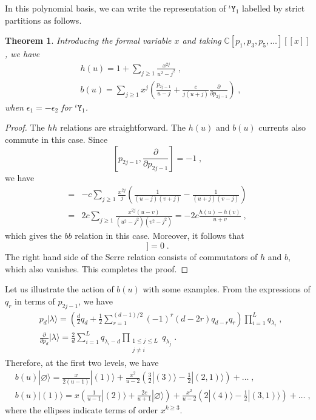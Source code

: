 \documentclass[11pt]{article}
\numberwithin{equation}{section}
\numberwithin{figure}{section}
\numberwithin{table}{section}
\newtheorem{theorem}{Theorem}[section]
\begin{document}
In this polynomial basis, we can write the representation of ${}^\iota\mathtt{Y}_1$ labelled by strict partitions as follows.
\begin{theorem}
	Introducing the formal variable $x$ and taking $\mathbb{C}[p_1,p_3,p_5,\dots][\![x]\!]$, we have
	\begin{subequations}
		\begin{align}
			&h(u)=1+\sum_{j\geq1}\frac{x^{2j}}{u^2-j^2}\;,\\
			&b(u)=\sum_{j\geq1}x^j\left(\frac{p_{2j-1}}{u-j}+\frac{c}{j(u+j)}\frac{\partial}{\partial p_{2j-1}}\right)\;,
		\end{align}
	\end{subequations}
	when $\epsilon_1=-\epsilon_2$ for ${}^\iota\mathtt{Y}_1$.
\end{theorem}
\begin{proof}
	The $hh$ relations are straightforward. The $h(u)$ and $b(u)$ currents also commute in this case. Since
	\begin{equation}
		\left[p_{2j-1},\frac{\partial}{\partial p_{2j-1}}\right]=-1\;,
	\end{equation}
	we have
	\begin{align}
		[b(u),b(v)]=&-c\sum_{j\geq1}\frac{x^{2j}}{j}\left(\frac1{(u-j)(v+j)}-\frac{1}{(u+j)(v-j)}\right)\nonumber\\
		=&2c\sum_{j\geq1}\frac{x^{2j}(u-v)}{(u^2-j^2)(v^2-j^2)}=-2c\frac{h(u)-h(v)}{u+v}\;,
	\end{align}
	which gives the $bb$ relation in this case. Moreover, it follows that
	\begin{equation}
		[b(u_1),[b(u_2),b(u_3)]]=0\;.
	\end{equation}
	The right hand side of the Serre relation consists of commutators of $h$ and $b$, which also vanishes. This completes the proof.
\end{proof}

Let us illustrate the action of $b(u)$ with some examples. From the expressions of $q_r$ in terms of $p_{2j-1}$, we have
\begin{subequations}
	\begin{align}
		&p_d|\lambda\rangle=\left(\frac{d}{2}q_d+\frac{1}{2}\sum_{r=1}^{(d-1)/2}(-1)^r(d-2r)q_{d-r}q_r\right)\prod_{i=1}^Lq_{\lambda_i}\;,\\
		&\frac{\partial}{\partial p_d}|\lambda\rangle=\frac{2}{d}\sum_{i=1}^Lq_{\lambda_i-d}\prod_{\substack{1\leq j\leq L\\j\neq i}}q_{\lambda_j}\;.
	\end{align}
\end{subequations}
Therefore, at the first two levels, we have
\begin{subequations}
	\begin{align}
		&b(u)|\varnothing\rangle=\frac{x}{2(u-1)}|(1)\rangle+\frac{x^2}{u-2}\left(\frac{3}{2}|(3)\rangle-\frac{1}{2}|(2,1)\rangle\right)+\dots\;,\\
		&b(u)|(1)\rangle=x\left(\frac{1}{u-1}|(2)\rangle+\frac{2c}{u+1}|\varnothing\rangle\right)+\frac{x^2}{u-2}\left(2|(4)\rangle-\frac{1}{2}|(3,1)\rangle\right)+\dots\;,
	\end{align}
\end{subequations}
where the ellipses indicate terms of order $x^{k\geq3}$.
\end{document}
